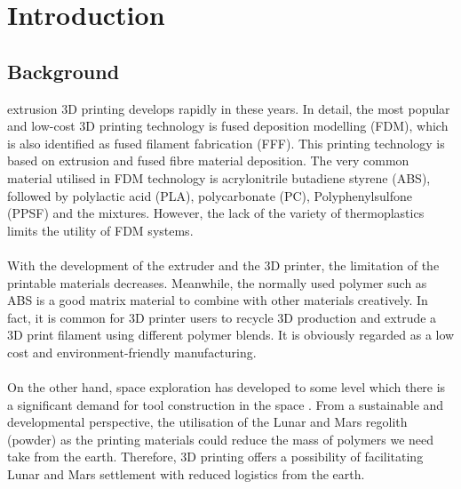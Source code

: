 \chapter{Introduction}
\renewcommand{\baselinestretch}{\mystretch}
\label{chap:Intro}

\section{Background}

 extrusion 3D printing develops rapidly in these years. In detail, the most popular and low-cost 3D printing technology is fused deposition modelling (FDM), which is also identified as fused filament fabrication (FFF). This printing technology is based on extrusion and fused fibre material deposition. The very common material utilised in FDM technology is acrylonitrile butadiene styrene (ABS), followed by polylactic acid (PLA), polycarbonate (PC), Polyphenylsulfone (PPSF) and the mixtures. However, the lack of the variety of thermoplastics limits the utility of FDM systems. \\
\\
With the development of the extruder and the 3D printer, the limitation of the printable materials decreases. Meanwhile, the normally used polymer such as ABS is a good matrix material to combine with other materials creatively. In fact, it is common for 3D printer users to recycle 3D production and extrude a 3D print filament using different polymer blends. It is obviously regarded as a low cost and environment-friendly manufacturing. \\
\\
On the other hand, space exploration has developed to some level which there is a significant demand for tool construction in the space \cite{khoshnevis2015selective}. From a sustainable and developmental perspective, the utilisation of the Lunar and Mars regolith (powder) as the printing materials could reduce the mass of polymers we need take from the earth. Therefore, 3D printing offers a possibility of facilitating Lunar and Mars settlement with reduced logistics from the earth.

